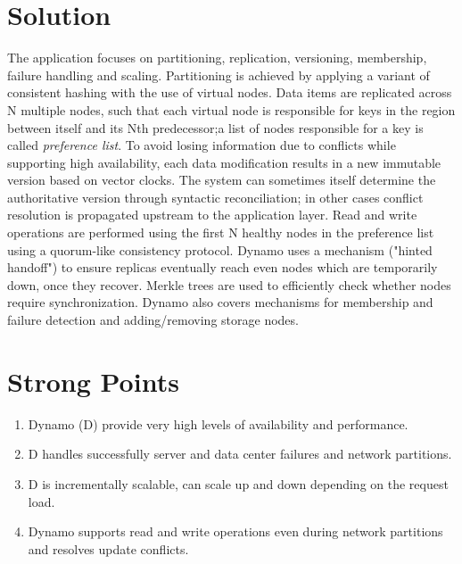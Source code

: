 \documentclass[10pt]{proc}
\begin{document}
\section{Solution}
The application focuses on partitioning, replication, versioning, membership, failure handling and scaling. Partitioning is achieved by applying a variant of consistent hashing with the use of virtual nodes.
Data items are replicated across N multiple nodes, such that each virtual node is responsible for keys in the region between itself and its Nth predecessor;a list of nodes responsible for a key is called \emph{preference list}. 
To avoid losing information due to conflicts while supporting high availability, each data modification results in a new immutable version based on vector clocks. 
The system can sometimes itself determine the authoritative version through syntactic reconciliation; in other cases conflict resolution is propagated upstream to the application layer. 
Read and write operations are performed using the first N healthy nodes in the preference list using a quorum-like consistency protocol. 
Dynamo uses a mechanism ("hinted handoff") to ensure replicas eventually reach even nodes which are temporarily down, once they recover. 
Merkle trees are used to efficiently check whether nodes require synchronization. 
Dynamo also covers mechanisms for membership and failure detection and adding/removing storage nodes.

\section{Strong Points}
\begin{enumerate}
\item Dynamo (D) provide very high levels of availability and performance.
\item D handles successfully server and data center failures and network partitions. 
\item D is incrementally scalable, can scale up and down depending on the request load.
\item Dynamo supports read and write operations even during network partitions and resolves update conflicts.
\end{enumerate}
\end{document}
